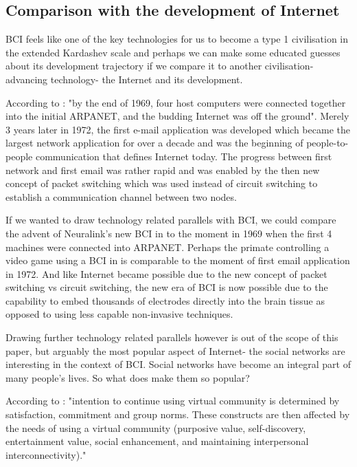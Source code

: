 \documentclass[fleqn,11pt]{olplainarticle}
\begin{document}
\subsection{Comparison with the development of Internet}
BCI feels like one of the key technologies for us to become a type 1 civilisation in the extended Kardashev scale \cite{gray2020extended} and perhaps we can make some educated guesses about its development trajectory if we compare it to another civilisation-advancing technology- the Internet and its development.

According to \cite{leiner2009brief}: "by the end of 1969, four host computers were
connected together into the initial ARPANET, and the budding Internet was off the ground". Merely 3 years later in 1972, the first e-mail application was developed which became the largest network application for over a decade and was the beginning of people-to-people communication that defines Internet today. The progress between first network and first email was rather rapid and was enabled by the then new concept of packet switching which was used instead of circuit switching to establish a communication channel between two nodes.

If we wanted to draw technology related parallels with BCI, we could compare the advent of Neuralink's new BCI in \cite{musk2019integrated} to the moment in 1969 when the first 4 machines were connected into ARPANET. Perhaps the primate controlling a video game using a BCI in \cite{wakefield_2020} is comparable to the moment of first email application in 1972. And like Internet became possible due to the new concept of packet switching vs circuit switching, the new era of BCI is now possible due to the capability to embed thousands of electrodes directly into the brain tissue as opposed to using less capable non-invasive techniques.

Drawing further technology related parallels however is out of the scope of this paper, but arguably the most popular aspect of Internet- the social networks are interesting in the context of BCI. Social networks have become an integral part of many people's lives. So what does make them so popular?

According to \cite{cheung2009understanding}: "intention to continue using virtual community is determined by satisfaction, commitment and group norms. These constructs are then affected by the needs of using a virtual community (purposive value, self-discovery, entertainment value, social enhancement, and maintaining interpersonal interconnectivity)."
\end{document}
